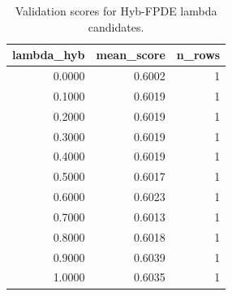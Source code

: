 \begin{table}[t]
\caption{Validation scores for Hyb-FPDE lambda candidates.}
\label{tab:lambda_distribution_computed}
\centering
\begin{tabular}{rrr}
\toprule
lambda\_hyb & mean\_score & n\_rows \\
\midrule
0.0000 & 0.6002 & 1 \\
0.1000 & 0.6019 & 1 \\
0.2000 & 0.6019 & 1 \\
0.3000 & 0.6019 & 1 \\
0.4000 & 0.6019 & 1 \\
0.5000 & 0.6017 & 1 \\
0.6000 & 0.6023 & 1 \\
0.7000 & 0.6013 & 1 \\
0.8000 & 0.6018 & 1 \\
0.9000 & 0.6039 & 1 \\
1.0000 & 0.6035 & 1 \\
\bottomrule
\end{tabular}

\end{table}
